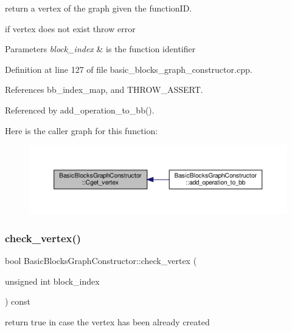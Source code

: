 return a vertex of the graph given the function\+ID. 

if vertex does not exist throw error 
\begin{DoxyParams}{Parameters}
{\em block\+\_\+index} & is the function identifier \\
\hline
\end{DoxyParams}


Definition at line 127 of file basic\+\_\+blocks\+\_\+graph\+\_\+constructor.\+cpp.



References bb\+\_\+index\+\_\+map, and T\+H\+R\+O\+W\+\_\+\+A\+S\+S\+E\+RT.



Referenced by add\+\_\+operation\+\_\+to\+\_\+bb().

Here is the caller graph for this function\+:
\nopagebreak
\begin{figure}[H]
\begin{center}
\leavevmode
\includegraphics[width=350pt]{d6/d91/classBasicBlocksGraphConstructor_a75dc45851229f515c373cafdc845e877_icgraph}
\end{center}
\end{figure}
\mbox{\label{classBasicBlocksGraphConstructor_a96fd9387eca2922fcbd13002c95a30c1}} 
\subsubsection{\texorpdfstring{check\+\_\+vertex()}{check\_vertex()}}
{\footnotesize\ttfamily bool Basic\+Blocks\+Graph\+Constructor\+::check\+\_\+vertex (\begin{DoxyParamCaption}\item[{unsigned int}]{block\+\_\+index }\end{DoxyParamCaption}) const}



return true in case the vertex has been already created 


